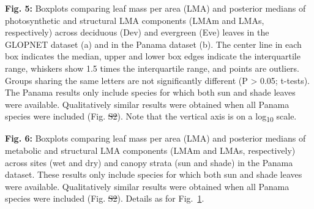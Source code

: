 \documentclass[
  12pt,
  letterpaper,
  DIV=11,
  numbers=noendperiod]{scrartcl}
\providecommand{\DIFadd}[1]{{\protect\color{blue}\uwave{#1}}} %
\providecommand{\DIFdel}[1]{{\protect\color{red}\sout{#1}}}                      %
\providecommand{\DIFaddbegin}{} %
\providecommand{\DIFaddend}{} %
\providecommand{\DIFdelbegin}{} %
\providecommand{\DIFdelend}{} %
\newcommand{\DIFscaledelfig}{0.5}
\newlength{\DIFdelgraphicswidth} %
\newlength{\DIFdelgraphicsheight} %
\newcommand{\DIFaddincludegraphics}[2][]{{\color{blue}\fbox{\DIFOincludegraphics[#1]{#2}}}} %
\newcommand{\DIFdelincludegraphics}[2][]{%
\sbox{\DIFdelgraphicsbox}{\DIFOincludegraphics[#1]{#2}}%
\settoboxwidth{\DIFdelgraphicswidth}{\DIFdelgraphicsbox} %
\settoboxtotalheight{\DIFdelgraphicsheight}{\DIFdelgraphicsbox} %
\scalebox{\DIFscaledelfig}{%
\parbox[b]{\DIFdelgraphicswidth}{\usebox{\DIFdelgraphicsbox}\\[-\baselineskip] \rule{\DIFdelgraphicswidth}{0em}}\llap{\resizebox{\DIFdelgraphicswidth}{\DIFdelgraphicsheight}{%
\setlength{\unitlength}{\DIFdelgraphicswidth}%
\begin{picture}(1,1)%
\thicklines\linethickness{2pt} %
{\color[rgb]{1,0,0}\put(0,0){\framebox(1,1){}}}%
{\color[rgb]{1,0,0}\put(0,0){\line( 1,1){1}}}%
{\color[rgb]{1,0,0}\put(0,1){\line(1,-1){1}}}%
\end{picture}%
}\hspace*{3pt}}} %
} %
\DeclareRobustCommand{\DIFaddbegin}{\DIFOaddbegin \let\includegraphics\DIFaddincludegraphics} %
\DeclareRobustCommand{\DIFaddend}{\DIFOaddend \let\includegraphics\DIFOincludegraphics} %
\DeclareRobustCommand{\DIFdelbegin}{\DIFOdelbegin \let\includegraphics\DIFdelincludegraphics} %
\DeclareRobustCommand{\DIFdelend}{\DIFOaddend \let\includegraphics\DIFOincludegraphics} %
\begin{document}
\begin{figure}

\centering{

}

\caption{\label{fig-box_de}}

\end{figure}%

\textbf{Fig. 5:} Boxplots comparing leaf mass per area (LMA) and
posterior medians of photosynthetic and structural LMA components (LMAm
and LMAs, respectively) across deciduous (Dev) and evergreen (Eve)
leaves in the GLOPNET dataset (a) and in the Panama dataset (b). The
center line in each box indicates the median, upper and lower box edges
indicate the interquartile range, whiskers show 1.5 times the
interquartile range, and points are outliers. Groups sharing the same
letters are not significantly different (P \textgreater{} 0.05;
t-tests). The Panama results only include species for which both sun and
shade leaves were available. Qualitatively similar results were obtained
when all Panama species were included (Fig. \DIFdelbegin \DIFdel{S2}\DIFdelend \DIFaddbegin \DIFadd{S3}\DIFaddend ). Note that the vertical
axis is on a log\textsubscript{10} scale.

\begin{figure}

\centering{

}

\caption{\label{fig-box_pa}}

\end{figure}%

\textbf{Fig. 6:} Boxplots comparing leaf mass per area (LMA) and
posterior medians of metabolic and structural LMA components (LMAm and
LMAs, respectively) across sites (wet and dry) and canopy strata (sun
and shade) in the Panama dataset. These results only include species for
which both sun and shade leaves were available. Qualitatively similar
results were obtained when all Panama species were included (Fig. \DIFdelbegin \DIFdel{S2}\DIFdelend \DIFaddbegin \DIFadd{S3}\DIFaddend ).
Details as for Fig.~\ref{fig-box_de}.

\begin{figure}

\centering{

}

\caption{\label{fig-mass_prop}}

\end{figure}%
\end{document}

